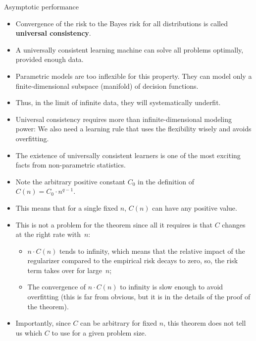\documentclass[11pt,compress,t,notes=noshow, xcolor=table]{beamer}
\begin{document}
\begin{vbframe}{Asymptotic performance}

  \begin{itemize}
    \item Convergence of the risk to the Bayes risk for all distributions
    is called \textbf{universal consistency}.
    \item A universally consistent learning machine can solve all problems
    optimally, provided enough data.
    \item Parametric models are too inflexible for this property. They
    can model only a finite-dimensional subspace (manifold) of
    decision functions.
    \item Thus, in the limit of infinite data, they will systematically
    underfit.
    \item Universal consistency requires more than infinite-dimensional
    modeling power: We also need a learning rule that uses the
    flexibility wisely and avoids overfitting.
    \item The existence of universally consistent learners is one of the
    most exciting facts from non-parametric statistics.
  \end{itemize}

  \framebreak

  \begin{itemize}
    \item Note the arbitrary positive constant $C_0$ in the definition
    of $C(n) = C_0 \cdot n^{q - 1}$.
    \item This means that for a single fixed $n$, $C(n)$ can have
    any positive value.
    \item This is not a problem for the theorem since all it requires is that
    $C$ changes at the right rate with~$n$:

    \begin{itemize}
      \item $n \cdot C(n)$ tends to infinity, which means that the
      relative impact of the regularizer compared to the empirical
      risk decays to zero, so, the risk term takes over for
      large~$n$;
      \item The convergence of $n \cdot C(n)$ to infinity is slow
      enough to avoid overfitting (this is far from obvious, but
      it is in the details of the proof of the theorem).
    \end{itemize}
    \item Importantly, since $C$ can be arbitrary for fixed $n$, this
    theorem does not tell us which $C$ to use for a given problem
    size.
  \end{itemize}

\end{vbframe}
\end{document}
